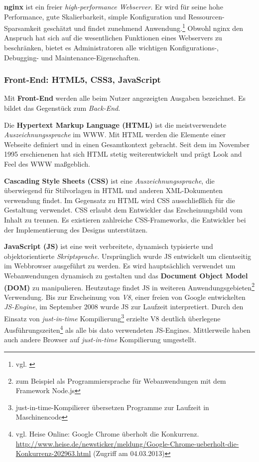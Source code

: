 \documentclass[12pt,a4paper,pointednumbers,abstracton]{scrartcl}
\begin{document}
\textbf{nginx} ist ein freier \emph{high-performance Webserver}.
Er wird für seine hohe Performance, gute Skalierbarkeit, simple Konfiguration und Ressourcen-Sparsamkeit geschätzt und findet zunehmend Anwendung.\footnote{vgl. \cite[Abstract]{Ree08}}
Obwohl nginx den Anspruch hat sich auf die wesentlichen Funktionen eines Webservers zu beschränken, bietet es Administratoren alle wichtigen Konfigurations-, Debugging- und Maintenance-Eigenschaften.

\subsubsection{Front-End: HTML5, CSS3, JavaScript}

Mit \textbf{Front-End} werden alle beim Nutzer angezeigten Ausgaben bezeichnet. Es bildet das Gegenstück zum \emph{Back-End}. 

Die \textbf{Hypertext Markup Language (HTML)} ist die meistverwendete \emph{Auszeichnungssprache} im WWW.
Mit HTML werden die Elemente einer Webseite definiert und in einen Gesamtkontext gebracht.
Seit dem im November 1995 erschienenen \cite{RFC1866} hat sich HTML stetig weiterentwickelt und prägt Look and Feel des WWW maßgeblich.

\textbf{Cascading Style Sheets (CSS)} ist eine \emph{Auszeichnungssprache}, die überwiegend für Stilvorlagen in HTML und anderen XML-Dokumenten verwendung findet.
Im Gegensatz zu HTML wird CSS ausschließlich für die Gestaltung verwendet.
CSS erlaubt dem Entwickler das Erscheinungsbild vom Inhalt zu trennen.
Es existieren zahlreiche CSS-Frameworks, die Entwickler bei der Implementierung des Designs unterstützen.

\textbf{JavaScript (JS)} ist eine weit verbreitete, dynamisch typisierte und objektorientierte \emph{Skriptsprache}.
Ursprünglich wurde JS entwickelt um clientseitig im Webbrowser ausgeführt zu werden.
Es wird hauptsächlich verwendet um Webanwendungen dynamisch zu gestalten und das \textbf{Document Object Model (DOM)} zu manipulieren.
Heutzutage findet JS in weiteren Anwendungsgebieten\footnote{zum Beispiel als Programmiersprache für Webanwendungen mit dem Framework Node.js} Verwendung.
Bis zur Erscheinung von \emph{V8}, einer freien von Google entwickelten \emph{JS-Engine}, im September 2008 wurde JS zur Laufzeit interpretiert.
Durch den Einsatz von \emph{just-in-time} Kompilierung\footnote{just-in-time-Kompilierer übersetzen Programme zur Laufzeit in Maschinencode} erzielte V8 deutlich überlegene Ausführungszeiten\footnote{vgl. Heise Online: Google Chrome überholt die Konkurrenz. \url{http://www.heise.de/newsticker/meldung/Google-Chrome-ueberholt-die-Konkurrenz-202963.html} (Zugriff am 04.03.2013)} als alle bis dato verwendeten JS-Engines.
Mittlerweile haben auch andere Browser auf \emph{just-in-time} Kompilierung umgestellt.
\end{document}
